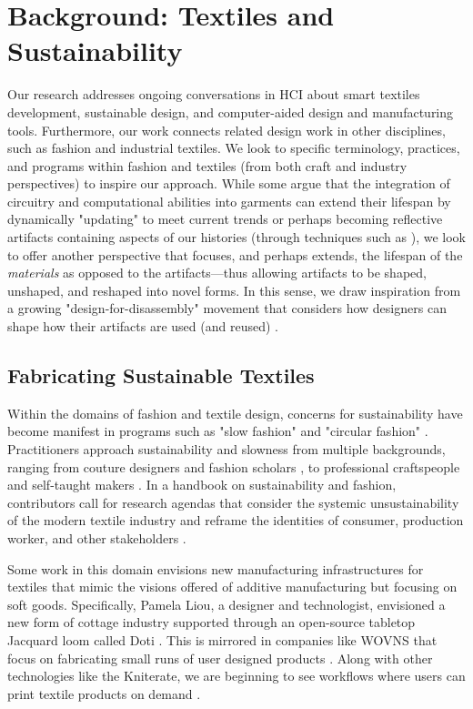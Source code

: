 \section{Background: Textiles and Sustainability}
Our research addresses ongoing conversations in HCI about smart textiles development, sustainable design, and computer-aided design and manufacturing tools. Furthermore, our work connects related design work in other disciplines, such as fashion and industrial textiles. We look to specific terminology, practices, and programs within fashion and textiles (from both craft and industry perspectives) to inspire our approach.  While some argue that the integration of circuitry and computational abilities into garments can extend their lifespan by dynamically "updating" to meet current trends  \cite{ivan_keynote} or perhaps becoming reflective artifacts containing aspects of our histories (through techniques such as \cite{rosner_spyn:_2008}), we look to offer another perspective that focuses, and perhaps extends, the lifespan of the \textit{materials} as opposed to the artifacts---thus allowing artifacts to be shaped, unshaped, and reshaped into novel forms. In this sense, we draw inspiration from a growing "design-for-disassembly" movement that considers how designers can shape how their artifacts are used (and reused) \cite{webster_dfd, circular_disassembly}.

\subsection{Fabricating Sustainable Textiles}
Within the domains of fashion and textile design, concerns for sustainability have become manifest in programs such as "slow fashion" \cite{phelan_what_2017} and "circular fashion" \cite{circular_fashion}. Practitioners approach sustainability and slowness from multiple backgrounds, ranging from couture designers \cite{piper_crafting_2015} and fashion scholars \cite{fletcher_sustainability_2014, fletcher_craft_2016}, to professional craftspeople \cite{essen_easysupp_2016, unravellingclub} and self-taught makers \cite{ravelry_thriftyknitters}. In a handbook on sustainability and fashion, contributors call for research agendas that consider the systemic unsustainability of the modern textile industry and reframe the identities of consumer, production worker, and other stakeholders \cite{fletcher_sustainability_2014}.

Some work in this domain envisions new manufacturing infrastructures for textiles that mimic the visions offered of additive manufacturing but focusing on soft goods. Specifically, Pamela Liou, a designer and technologist, envisioned a new form of cottage industry supported through an open-source tabletop Jacquard loom called Doti \cite{liou_doti:_2015}. This is mirrored in companies like WOVNS that focus on fabricating small runs of user designed products \cite{wovns}. Along with other technologies like the Kniterate, we are beginning to see workflows where users can print textile products on demand \cite{kniterate}. 

